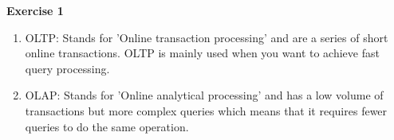 {\bf \Huge Exercise 1}

\begin{enumerate}
\item OLTP: Stands for 'Online transaction processing' and are a series of short online transactions. OLTP is mainly used when you want to achieve fast query processing.
\item OLAP: Stands for 'Online analytical processing' and has a low volume of transactions but more complex queries which means that it requires fewer queries to do the same operation. 
\end{enumerate}